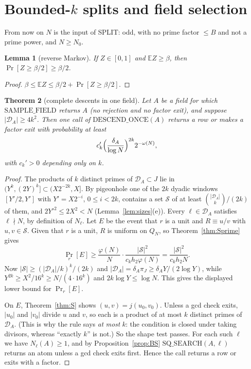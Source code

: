 \documentclass[11pt]{amsart}
\newtheorem{theorem}{Theorem}[section]
\newtheorem{lemma}[theorem]{Lemma}
\theoremstyle{definition}
\newcommand{\cD}{\mathcal{D}}
\newcommand{\cS}{\mathcal{S}}
\newcommand{\Ex}{\mathbb{E}}
\newcommand{\Prob}{\Pr}
\begin{document}
\section{Bounded-\texorpdfstring{$k$}{k} splits and field selection}\label{sec:K}

From now on $N$ is the input of SPLIT: odd, with no prime factor $\le B$ and not a prime power, and $N\ge N_0$.

\begin{lemma}[reverse Markov]\label{lem:revmarkov}
If $Z\in[0,1]$ and $\Ex Z\ge\beta$, then $\Prob[Z\ge\beta/2]\ge\beta/2$.
\end{lemma}

\begin{proof}
$\beta\le\Ex Z\le\beta/2+\Prob[Z\ge\beta/2]$.
\end{proof}

\begin{theorem}[complete descents in one field]\label{thm:K}
Let $A$ be a field for which $\mathrm{SAMPLE\_FIELD}$ returns $A$ (no rejection and no factor exit), and suppose
$|\cD_A|\ge4k^2$. Then one call of $\mathrm{DESCEND\_ONCE}(A)$ returns a row or makes a factor exit with probability at
least
\[
c_k'\Bigl(\frac{\delta_A}{\log N}\Bigr)^{2k}2^{-\omega(N)},
\]
with $c_k'>0$ depending only on $k$.
\end{theorem}

\begin{proof}
The products of $k$ distinct primes of $\cD_A\subset J$ lie in $(Y^k,(2Y)^k]\subset(X2^{-2k},X]$. By pigeonhole one of the $2k$
dyadic windows $[Y'/2,Y']$ with $Y'=X2^{-i}$, $0\le i<2k$, contains a set $\cS$ of at least $\binom{|\cD_A|}k/(2k)$ of them, and
$2Y'^2\le2X^2<N$ (Lemma~\ref{lem:sizes}(e)).
Every $\ell\in\cD_A$ satisfies $\ell\nmid N$, by definition of $N_\ell$. Let $E$ be the event that $r$ is a unit and $R\equiv u/v$
with $u,v\in\cS$. Given that $r$ is a unit, $R$ is uniform on $Q_N$, so Theorem~\ref{thm:Sprime} gives
\[
\Prob_r[E]\ge\frac{\varphi(N)}{N}\cdot\frac{|\cS|^2}{c_kh_2\varphi(N)}=\frac{|\cS|^2}{c_kh_2N}.
\]
Now $|\cS|\ge(|\cD_A|/k)^k/(2k)$ and $|\cD_A|=\delta_A\pi_J\ge\delta_AY/(2\log Y)$, while
$Y^{2k}\ge X^2/16^k\ge N/(4\cdot16^k)$ and $2k\log Y\le\log N$. This gives the displayed lower bound for $\Prob_r[E]$.

On $E$, Theorem~\ref{thm:S} shows $(u,v)=j(u_0,v_0)$. Unless a gcd check exits, $|u_0|$ and $|v_0|$ divide $u$ and $v$, so
each is a product of at most $k$ distinct primes of $\cD_A$. (This is why the rule says \emph{at most} $k$: the
condition is closed under taking divisors, whereas ``exactly $k$'' is not.) So the shape test passes. For each such
$\ell$ we have $N_\ell(A)\ge1$, and by Proposition~\ref{prop:BS} $\mathrm{SQ\_SEARCH}(A,\ell)$ returns an atom unless a gcd check
exits first. Hence the call returns a row or exits with a factor.
\end{proof}
\end{document}
